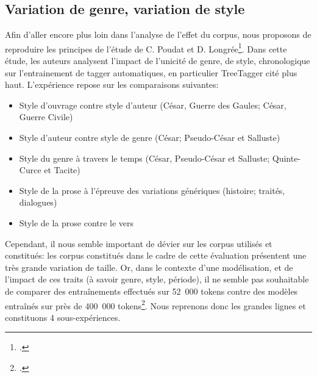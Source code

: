 \subsection{Variation de genre, variation de style}
\label{lemmatisation:extensibilite:prose-vers}

Afin d'aller encore plus loin dans l'analyse de l'effet du corpus, nous proposons de reproduire les principes de l'étude de C. Poudat et D. Longrée\footcite{poudat2009variations}. Dans cette étude, les auteurs analysent l'impact de l'unicité de genre, de style, chronologique sur l'entrainement de tagger automatiques, en particulier TreeTagger cité plus haut. L'expérience repose sur les comparaisons suivantes:
\begin{itemize}
    \item Style d'ouvrage contre style d'auteur (César, Guerre des Gaules; César, Guerre Civile)
    \item Style d'auteur contre style de genre (César; Pseudo-César et Salluste)
    \item Style du genre à travers le temps (César, Pseudo-César et Salluste; Quinte-Curce et Tacite)
    \item Style de la prose à l'épreuve des variations génériques (histoire; traités, dialogues)
    \item Style de la prose contre le vers
\end{itemize}{}

Cependant, il nous semble important de dévier sur les corpus utilisés et constitués: les corpus constitués dans le cadre de cette évaluation présentent une très grande variation de taille. Or, dans le contexte d'une modélisation, et de l'impact de ces traits (à savoir genre, style, période), il ne semble pas souhaitable de comparer des entraînements effectués sur 52~000 tokens contre des modèles entraînés sur près de 400~000 tokens\footcite[par exemple, p.~135, 2.~2.~4]{poudat2009variations}. Nous reprenons donc les grandes lignes et constituons 4 sous-expériences.


